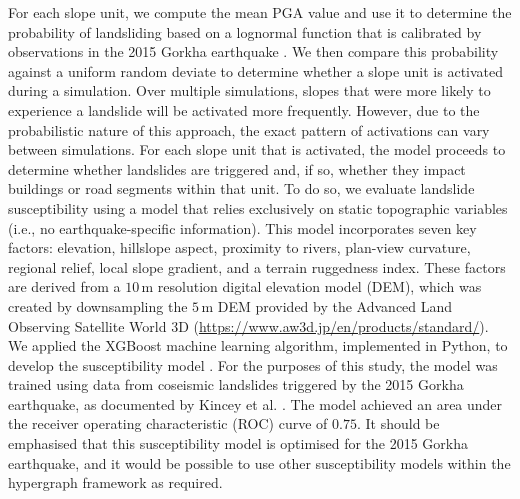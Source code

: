 \documentclass[preprint,12pt,authoryear]{elsarticle}
\begin{document}
For each slope unit, we compute the mean PGA value and use it to determine the probability of landsliding based on a lognormal function that is calibrated by observations in the 2015 Gorkha earthquake \citep{Dunant2025}. We then compare this probability against a uniform random deviate to determine whether a slope unit is activated during a simulation. Over multiple simulations, slopes that were more likely to experience a landslide will be activated more frequently. However, due to the probabilistic nature of this approach, the exact pattern of activations can vary between simulations. For each slope unit that is activated, the model proceeds to determine whether landslides are triggered and, if so, whether they impact buildings or road segments within that unit. To do so, we evaluate landslide susceptibility using a model that relies exclusively on static topographic variables (i.e., no earthquake-specific information). This model incorporates seven key factors: elevation, hillslope aspect, proximity to rivers, plan-view curvature, regional relief, local slope gradient, and a terrain ruggedness index. These factors are derived from a $10\,\text{m}$ resolution digital elevation model (DEM), which was created by downsampling the $5\,\text{m}$ DEM provided by the Advanced Land Observing Satellite World 3D (\url{https://www.aw3d.jp/en/products/standard/}). We applied the XGBoost machine learning algorithm, implemented in Python, to develop the susceptibility model \citep{Dunant2025}. For the purposes of this study, the model was trained using data from coseismic landslides triggered by the 2015 Gorkha earthquake, as documented by Kincey et al. \citep{Kincey2021}. The model achieved an area under the receiver operating characteristic (ROC) curve of $0.75$. It should be emphasised that this susceptibility model is optimised for the 2015 Gorkha earthquake, and it would be possible to use other susceptibility models within the hypergraph framework as required.
\end{document}
